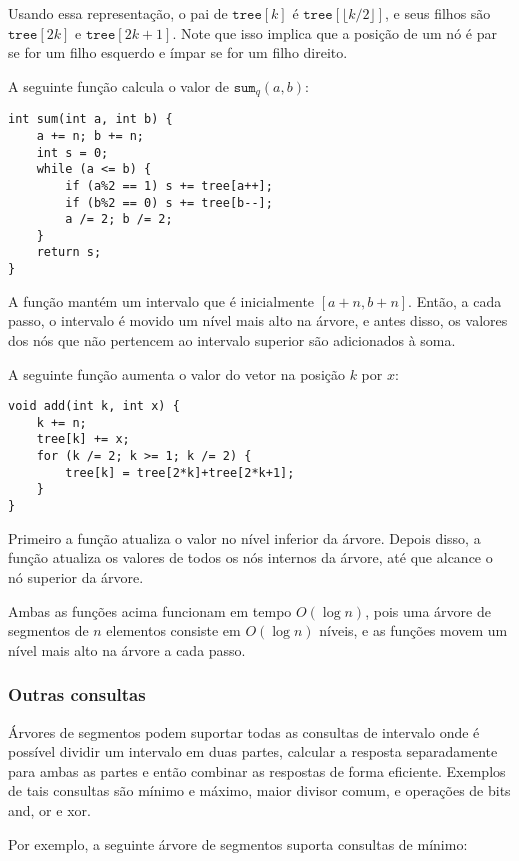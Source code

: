 Usando essa representação,
o pai de $\texttt{tree}[k]$
é $\texttt{tree}[\lfloor k/2 \rfloor]$,
e seus filhos são $\texttt{tree}[2k]$
e $\texttt{tree}[2k+1]$.
Note que isso implica que a posição de um nó
é par se for um filho esquerdo e ímpar se for um filho direito.

A seguinte função
calcula o valor de $\texttt{sum}_q(a,b)$:
\begin{lstlisting}
int sum(int a, int b) {
    a += n; b += n;
    int s = 0;
    while (a <= b) {
        if (a%2 == 1) s += tree[a++];
        if (b%2 == 0) s += tree[b--];
        a /= 2; b /= 2;
    }
    return s;
}
\end{lstlisting}
A função mantém um intervalo
que é inicialmente $[a+n,b+n]$.
Então, a cada passo, o intervalo é movido
um nível mais alto na árvore,
e antes disso, os valores dos nós que não
pertencem ao intervalo superior são adicionados à soma.

A seguinte função aumenta o valor do vetor
na posição $k$ por $x$:
\begin{lstlisting}
void add(int k, int x) {
    k += n;
    tree[k] += x;
    for (k /= 2; k >= 1; k /= 2) {
        tree[k] = tree[2*k]+tree[2*k+1];
    }
}
\end{lstlisting}
Primeiro a função atualiza o valor
no nível inferior da árvore.
Depois disso, a função atualiza os valores de todos
os nós internos da árvore, até que alcance
o nó superior da árvore.

Ambas as funções acima funcionam
em tempo $O(\log n)$, pois uma árvore de segmentos
de $n$ elementos consiste em $O(\log n)$ níveis,
e as funções movem um nível mais alto
na árvore a cada passo.

\subsubsection{Outras consultas}

Árvores de segmentos podem suportar todas as consultas de intervalo
onde é possível dividir um intervalo em duas partes,
calcular a resposta separadamente para ambas as partes
e então combinar as respostas de forma eficiente.
Exemplos de tais consultas são
mínimo e máximo, maior divisor comum,
e operações de bits and, or e xor.

Por exemplo, a seguinte árvore de segmentos
suporta consultas de mínimo:

